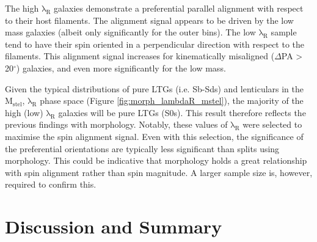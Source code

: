 The high $\mathrm{\lambda_R}$ galaxies demonstrate a preferential parallel alignment with respect to their host filaments. The alignment signal appears to be driven by the low mass galaxies (albeit only significantly for the outer bins). The low $\mathrm{\lambda_R}$ sample tend to have their spin oriented in a perpendicular direction with respect to the filaments. This alignment signal increases for kinematically misaligned ($\Delta$PA > 20$^{\circ}$) galaxies, and even more significantly for the low mass.

Given the typical distributions of pure LTGs (i.e. Sb-Sds) and lenticulars in the $\mathrm{M_{stel}}$, $\mathrm{\lambda_R}$ phase space (Figure \ref{fig:morph_lambdaR_mstel}), the majority of the high (low) $\mathrm{\lambda_R}$ galaxies will be pure LTGs (S0s). This result therefore reflects the previous findings with morphology. Notably, these values of $\mathrm{\lambda_R}$ were selected to maximise the spin alignment signal. Even with this selection, the significance of the preferential orientations are typically less significant than splits using morphology. This could be indicative that morphology holds a great relationship with spin alignment rather than spin magnitude. A larger sample size is, however, required to confirm this.

\section{Discussion and Summary} \label{sec:cw_spin_conclusion}


